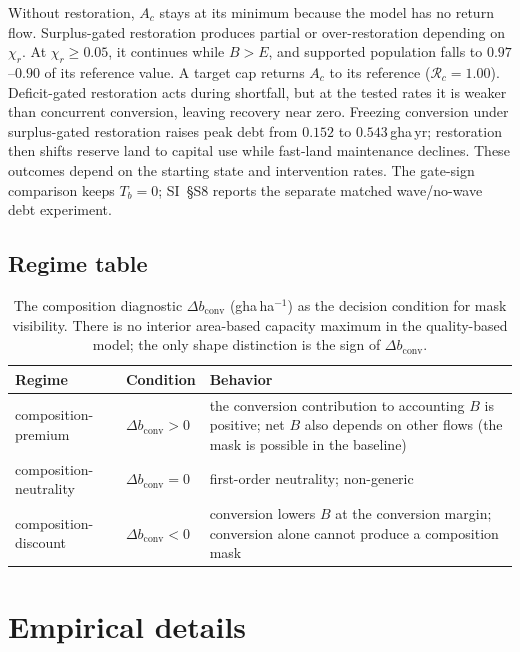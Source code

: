 \documentclass[11pt,a4paper]{article}
\newcommand{\dconv}{\Delta b_{\mathrm{conv}}}
\begin{document}
Without restoration, $A_c$ stays at its minimum because the model has no return flow. Surplus-gated restoration produces partial or over-restoration depending on $\chi_r$. At $\chi_r\ge0.05$, it continues while $B>E$, and supported population falls to $0.97$--$0.90$ of its reference value. A target cap returns $A_c$ to its reference ($\mathcal R_c=1.00$). Deficit-gated restoration acts during shortfall, but at the tested rates it is weaker than concurrent conversion, leaving recovery near zero. Freezing conversion under surplus-gated restoration raises peak debt from $0.152$ to $0.543$\,gha\,yr; restoration then shifts reserve land to capital use while fast-land maintenance declines. These outcomes depend on the starting state and intervention rates. The gate-sign comparison keeps $T_b=0$; SI~\S S8 reports the separate matched wave/no-wave debt experiment.\par\pagebreak

\subsection{Regime table}\label{si:regimes}

\begin{table}[H]
\centering\small
\caption{The composition diagnostic $\dconv$ (gha\,ha$^{-1}$) as the decision condition for mask visibility. There is no interior area-based capacity maximum in the quality-based model; the only shape distinction is the sign of $\dconv$.}
\label{tab:si_regime}
\begin{tabularx}{\textwidth}{l l X}
\toprule
Regime & Condition & Behavior \\
\midrule
composition-premium & $\dconv>0$ & the conversion contribution to accounting $B$ is positive; net $B$ also depends on other flows (the mask is possible in the baseline) \\
composition-neutrality & $\dconv=0$ & first-order neutrality; non-generic \\
composition-discount & $\dconv<0$ & conversion lowers $B$ at the conversion margin; conversion alone cannot produce a composition mask \\
\bottomrule
\end{tabularx}
\end{table}

\section{Empirical details}\label{si:empirical}
\end{document}
